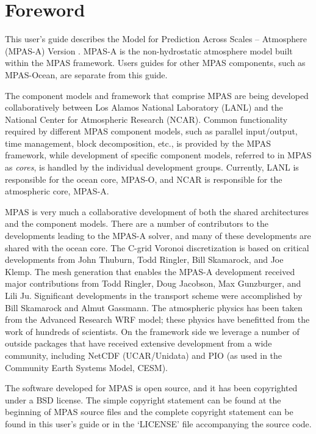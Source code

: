 \chapter*{Foreword}
\label{chap:foreword}

This user's guide describes the Model for Prediction Across Scales -- Atmosphere
(MPAS-A) Version \version.   MPAS-A is the non-hydrostatic atmosphere model built within the MPAS
framework. Users guides for other MPAS components, such as MPAS-Ocean, are separate from this guide.

The component models and framework that comprise MPAS are being developed collaboratively between Los Alamos National
Laboratory (LANL) and the National Center for Atmospheric Research (NCAR).
Common functionality required by different MPAS component models, such as parallel
input/output, time management, block decomposition, etc., is provided by the
MPAS framework, while development of specific component models, referred to in MPAS as {\em cores}, is handled by the
individual development groups.  Currently, LANL is responsible for the ocean core, MPAS-O, and NCAR is responsible for the atmospheric core, MPAS-A.

MPAS is very much a collaborative development of both the shared architectures and the component models.  There are a number of contributors to the developments leading to the MPAS-A solver, and many of these developments are shared with the ocean core.  The C-grid Voronoi discretization is based on critical developments from John Thuburn, Todd Ringler, Bill Skamarock, and Joe Klemp.  The mesh generation that enables the MPAS-A development received major contributions from Todd Ringler, Doug Jacobson, Max Gunzburger, and Lili Ju.  Significant developments in the transport scheme were accomplished by Bill Skamarock and Almut Gassmann.  The atmospheric physics has been taken from the Advanced Research WRF model; these physics have benefitted from the work of hundreds of scientists.  On the framework side we leverage a number of outside packages that have received extensive development from a wide community, including NetCDF (UCAR/Unidata) and PIO (as used in the Community Earth Systems Model, CESM).

The software developed for MPAS is open source, and it has been copyrighted under a BSD license.  The simple copyright statement can be found at the beginning of MPAS source files and the complete copyright statement can be found in this user's guide or in the `LICENSE' file accompanying the source code.

